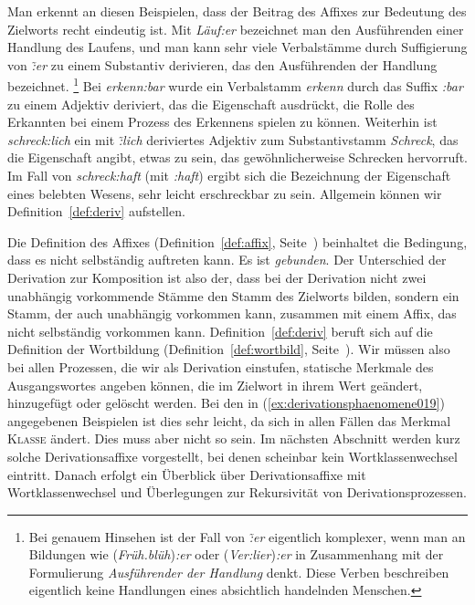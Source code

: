 \Stretch[0.5]

Man erkennt an diesen Beispielen, dass der Beitrag des Affixes zur Bedeutung des Zielworts recht eindeutig ist.
Mit \textit{Läuf:er} bezeichnet man den Ausführenden einer Handlung des Laufens, und man kann sehr viele Verbalstämme durch Suffigierung von \textit{\~:er} zu einem Substantiv derivieren, das den Ausführenden der Handlung bezeichnet.%
\footnote{Bei genauem Hinsehen ist der Fall von \textit{\~:er} eigentlich komplexer, wenn man an Bildungen wie (\textit{Früh.blüh})\textit{:er} oder (\textit{Ver:lier})\textit{:er} in Zusammenhang mit der Formulierung \textit{Ausführender der Handlung} denkt.
Diese Verben beschreiben eigentlich keine Handlungen eines absichtlich handelnden Menschen.}
Bei \textit{erkenn:bar} wurde ein Verbalstamm \textit{erkenn} durch das Suffix \textit{:bar} zu einem Adjektiv deriviert, das die Eigenschaft ausdrückt, die Rolle des Erkannten bei einem Prozess des Erkennens spielen zu können.
Weiterhin ist \textit{schreck:lich} ein mit \textit{\~:lich} deriviertes Adjektiv zum Substantivstamm \textit{Schreck}, das die Eigenschaft angibt, etwas zu sein, das gewöhnlicherweise Schrecken hervorruft.
Im Fall von \textit{schreck:haft} (mit \textit{:haft}) ergibt sich die Bezeichnung der Eigenschaft eines belebten Wesens, sehr leicht erschreckbar zu sein.
Allgemein können wir Definition~\ref{def:deriv} aufstellen.


Die Definition des Affixes (Definition~\ref{def:affix}, Seite~\pageref{def:affix}) beinhaltet die Bedingung, dass es nicht selbständig auftreten kann.
Es ist \textit{gebunden}.
Der Unterschied der Derivation zur Komposition ist also der, dass bei der Derivation nicht zwei unabhängig vorkommende Stämme den Stamm des Zielworts bilden, sondern ein Stamm, der auch unabhängig vorkommen kann, zusammen mit einem Affix, das nicht selbständig vorkommen kann.
Definition~\ref{def:deriv} beruft sich auf die Definition der Wortbildung (Definition~\ref{def:wortbild}, Seite~\pageref{def:wortbild}).
Wir müssen also bei allen Prozessen, die wir als Derivation einstufen, statische Merkmale des Ausgangswortes angeben können, die im Zielwort in ihrem Wert geändert, hinzugefügt oder gelöscht werden.
Bei den in (\ref{ex:derivationsphaenomene019}) angegebenen Beispielen ist dies sehr leicht, da sich in allen Fällen das Merkmal \textsc{Klasse} ändert.
Dies muss aber nicht so sein.
Im nächsten Abschnitt werden kurz solche Derivationsaffixe vorgestellt, bei denen scheinbar kein Wortklassenwechsel eintritt.
Danach erfolgt ein Überblick über Derivationsaffixe mit Wortklassenwechsel und Überlegungen zur Rekursivität von Derivationsprozessen.


